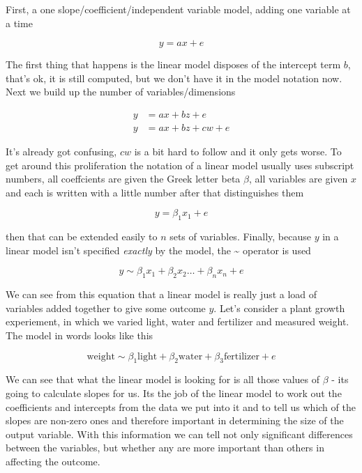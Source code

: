 \documentclass[
]{book}
\begin{document}
First, a one slope/coefficient/independent variable model, adding one variable at a time

\begin{equation}
y = ax + e
\end{equation}

The first thing that happens is the linear model disposes of the intercept term \(b\), that's ok, it is still computed, but we don't have it in the model notation now. Next we build up the number of variables/dimensions

\begin{align*}
y &= ax + bz + e\\
y &= ax + bz + cw + e
\end{align*}

It's already got confusing, \(cw\) is a bit hard to follow and it only gets worse. To get around this proliferation the notation of a linear model usually uses subscript numbers, all coeffcients are given the Greek letter beta \(\beta\), all variables are given \(x\) and each is written with a little number after that distinguishes them

\begin{equation}
y = \beta_1 x_1 + e
\end{equation}

then that can be extended easily to \(n\) sets of variables. Finally, because \(y\) in a linear model isn't specified \emph{exactly} by the model, the \textasciitilde{} operator is used

\begin{equation}
y \sim \beta_1 x_1 + \beta_2 x_2 \dotsc + \beta_n x_n + e
\end{equation}

We can see from this equation that a linear model is really just a load of variables added together to give some outcome \(y\). Let's consider a plant growth experiement, in which we varied light, water and fertilizer and measured weight. The model in words looks like this

\begin{equation}
\mbox{weight} \sim \beta_1 \mbox{light} + \beta_2 \mbox{water} + \beta_3 \mbox{fertilizer} + e 
\end{equation}

We can see that what the linear model is looking for is all those values of \(\beta\) - its going to calculate slopes for us. Its the job of the linear model to work out the coefficients and intercepts from the data we put into it and to tell us which of the slopes are non-zero ones and therefore important in determining the size of the output variable. With this information we can tell not only significant differences between the variables, but whether any are more important than others in affecting the outcome.
\end{document}
